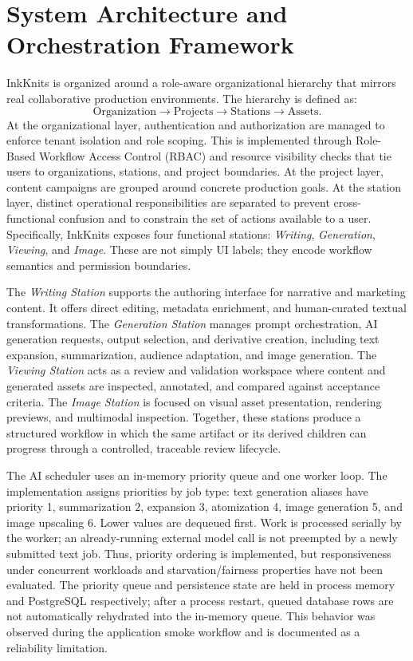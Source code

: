 \documentclass[conference]{IEEEtran}
\begin{document}
\section{System Architecture and Orchestration Framework}
InkKnits is organized around a role-aware organizational hierarchy that mirrors real collaborative production environments. The hierarchy is defined as:
\[
\text{Organization} \rightarrow \text{Projects} \rightarrow \text{Stations} \rightarrow \text{Assets}.
\]
At the organizational layer, authentication and authorization are managed to enforce tenant isolation and role scoping. This is implemented through Role-Based Workflow Access Control (RBAC) and resource visibility checks that tie users to organizations, stations, and project boundaries. At the project layer, content campaigns are grouped around concrete production goals. At the station layer, distinct operational responsibilities are separated to prevent cross-functional confusion and to constrain the set of actions available to a user. Specifically, InkKnits exposes four functional stations: \emph{Writing}, \emph{Generation}, \emph{Viewing}, and \emph{Image}. These are not simply UI labels; they encode workflow semantics and permission boundaries.

The \emph{Writing Station} supports the authoring interface for narrative and marketing content. It offers direct editing, metadata enrichment, and human-curated textual transformations. The \emph{Generation Station} manages prompt orchestration, AI generation requests, output selection, and derivative creation, including text expansion, summarization, audience adaptation, and image generation. The \emph{Viewing Station} acts as a review and validation workspace where content and generated assets are inspected, annotated, and compared against acceptance criteria. The \emph{Image Station} is focused on visual asset presentation, rendering previews, and multimodal inspection. Together, these stations produce a structured workflow in which the same artifact or its derived children can progress through a controlled, traceable review lifecycle.

The AI scheduler uses an in-memory priority queue and one worker loop. The implementation assigns priorities by job type: text generation aliases have priority 1, summarization 2, expansion 3, atomization 4, image generation 5, and image upscaling 6. Lower values are dequeued first. Work is processed serially by the worker; an already-running external model call is not preempted by a newly submitted text job. Thus, priority ordering is implemented, but responsiveness under concurrent workloads and starvation/fairness properties have not been evaluated. The priority queue and persistence state are held in process memory and PostgreSQL respectively; after a process restart, queued database rows are not automatically rehydrated into the in-memory queue. This behavior was observed during the application smoke workflow and is documented as a reliability limitation.
\end{document}

